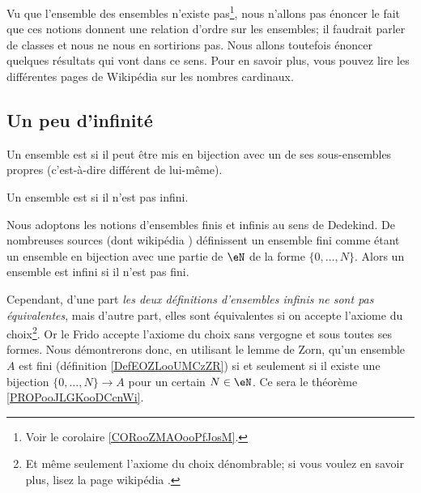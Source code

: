 Vu que l'ensemble des ensembles n'existe pas\footnote{Voir le corolaire \ref{CORooZMAOooPfJosM}.}, nous n'allons pas énoncer le fait que ces notions donnent une relation d'ordre sur les ensembles; il faudrait parler de classes et nous ne nous en sortirions pas. Nous allons toutefois énoncer quelques résultats qui vont dans ce sens. Pour en savoir plus, vous pouvez lire les différentes pages de Wikipédia sur les nombres cardinaux.

\subsection{Un peu d'infinité}

\begin{definition}      \label{DefEOZLooUMCzZR}
    Un ensemble est  si il peut être mis en bijection avec un de ses sous-ensembles propres (c'est-à-dire différent de lui-même).

    Un ensemble est  si il n'est pas infini.
\end{definition}

\begin{normaltext}
    Nous adoptons les notions d'ensembles finis et infinis au sens de Dedekind. De nombreuses sources (dont wikipédia \cite{BIBooJYONooLCnCtQ,BIBooPARTooZDteDq}) définissent un ensemble fini comme étant un ensemble en bijection avec une partie de \( \eN\) de la forme \( \{ 0,\ldots, N \}\). Alors un ensemble est infini si il n'est pas fini.

    Cependant, d'une part \emph{les deux définitions d'ensembles infinis ne sont pas équivalentes}, mais d'autre part, elles sont équivalentes si on accepte l'axiome du choix\footnote{Et même seulement l'axiome du choix dénombrable; si vous voulez en savoir plus, lisez la page wikipédia \cite{BIBooSPDRooHTpBqh}.}. Or le Frido accepte l'axiome du choix sans vergogne et sous toutes ses formes. Nous démontrerons donc, en utilisant le lemme de Zorn, qu'un ensemble \( A\) est fini (définition \ref{DefEOZLooUMCzZR}) si et seulement si il existe une bijection \( \{ 0,\ldots, N \}\to A\) pour un certain \( N\in \eN\). Ce sera le théorème  \ref{PROPooJLGKooDCcnWi}.
\end{normaltext}


